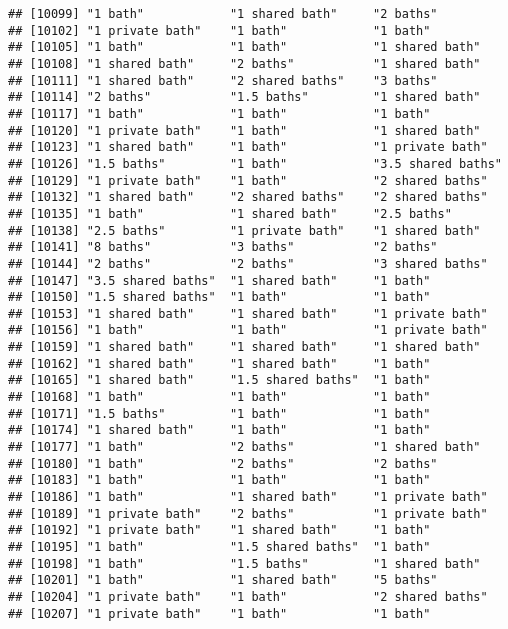 \documentclass[
]{article}
\begin{document}
\begin{verbatim}
## [10099] "1 bath"            "1 shared bath"     "2 baths"          
## [10102] "1 private bath"    "1 bath"            "1 bath"           
## [10105] "1 bath"            "1 bath"            "1 shared bath"    
## [10108] "1 shared bath"     "2 baths"           "1 shared bath"    
## [10111] "1 shared bath"     "2 shared baths"    "3 baths"          
## [10114] "2 baths"           "1.5 baths"         "1 shared bath"    
## [10117] "1 bath"            "1 bath"            "1 bath"           
## [10120] "1 private bath"    "1 bath"            "1 shared bath"    
## [10123] "1 shared bath"     "1 bath"            "1 private bath"   
## [10126] "1.5 baths"         "1 bath"            "3.5 shared baths" 
## [10129] "1 private bath"    "1 bath"            "2 shared baths"   
## [10132] "1 shared bath"     "2 shared baths"    "2 shared baths"   
## [10135] "1 bath"            "1 shared bath"     "2.5 baths"        
## [10138] "2.5 baths"         "1 private bath"    "1 shared bath"    
## [10141] "8 baths"           "3 baths"           "2 baths"          
## [10144] "2 baths"           "2 baths"           "3 shared baths"   
## [10147] "3.5 shared baths"  "1 shared bath"     "1 bath"           
## [10150] "1.5 shared baths"  "1 bath"            "1 bath"           
## [10153] "1 shared bath"     "1 shared bath"     "1 private bath"   
## [10156] "1 bath"            "1 bath"            "1 private bath"   
## [10159] "1 shared bath"     "1 shared bath"     "1 shared bath"    
## [10162] "1 shared bath"     "1 shared bath"     "1 bath"           
## [10165] "1 shared bath"     "1.5 shared baths"  "1 bath"           
## [10168] "1 bath"            "1 bath"            "1 bath"           
## [10171] "1.5 baths"         "1 bath"            "1 bath"           
## [10174] "1 shared bath"     "1 bath"            "1 bath"           
## [10177] "1 bath"            "2 baths"           "1 shared bath"    
## [10180] "1 bath"            "2 baths"           "2 baths"          
## [10183] "1 bath"            "1 bath"            "1 bath"           
## [10186] "1 bath"            "1 shared bath"     "1 private bath"   
## [10189] "1 private bath"    "2 baths"           "1 private bath"   
## [10192] "1 private bath"    "1 shared bath"     "1 bath"           
## [10195] "1 bath"            "1.5 shared baths"  "1 bath"           
## [10198] "1 bath"            "1.5 baths"         "1 shared bath"    
## [10201] "1 bath"            "1 shared bath"     "5 baths"          
## [10204] "1 private bath"    "1 bath"            "2 shared baths"   
## [10207] "1 private bath"    "1 bath"            "1 bath"           

\end{verbatim}
\end{document}
